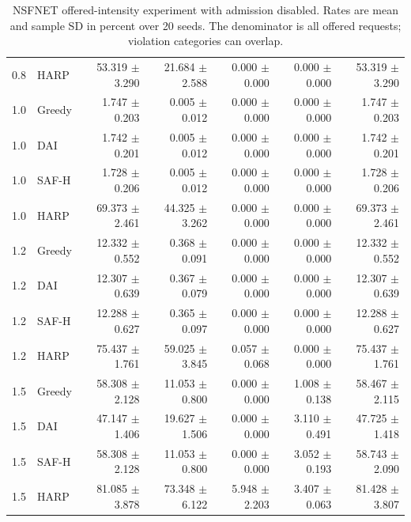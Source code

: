 \begin{table}[p]
\begin{tabular}{llrrrrr}
0.8 & HARP & 53.319 $\pm$ 3.290 & 21.684 $\pm$ 2.588 & 0.000 $\pm$ 0.000 & 0.000 $\pm$ 0.000 & 53.319 $\pm$ 3.290 \\
1.0 & Greedy & 1.747 $\pm$ 0.203 & 0.005 $\pm$ 0.012 & 0.000 $\pm$ 0.000 & 0.000 $\pm$ 0.000 & 1.747 $\pm$ 0.203 \\
1.0 & DAI & 1.742 $\pm$ 0.201 & 0.005 $\pm$ 0.012 & 0.000 $\pm$ 0.000 & 0.000 $\pm$ 0.000 & 1.742 $\pm$ 0.201 \\
1.0 & SAF-H & 1.728 $\pm$ 0.206 & 0.005 $\pm$ 0.012 & 0.000 $\pm$ 0.000 & 0.000 $\pm$ 0.000 & 1.728 $\pm$ 0.206 \\
1.0 & HARP & 69.373 $\pm$ 2.461 & 44.325 $\pm$ 3.262 & 0.000 $\pm$ 0.000 & 0.000 $\pm$ 0.000 & 69.373 $\pm$ 2.461 \\
1.2 & Greedy & 12.332 $\pm$ 0.552 & 0.368 $\pm$ 0.091 & 0.000 $\pm$ 0.000 & 0.000 $\pm$ 0.000 & 12.332 $\pm$ 0.552 \\
1.2 & DAI & 12.307 $\pm$ 0.639 & 0.367 $\pm$ 0.079 & 0.000 $\pm$ 0.000 & 0.000 $\pm$ 0.000 & 12.307 $\pm$ 0.639 \\
1.2 & SAF-H & 12.288 $\pm$ 0.627 & 0.365 $\pm$ 0.097 & 0.000 $\pm$ 0.000 & 0.000 $\pm$ 0.000 & 12.288 $\pm$ 0.627 \\
1.2 & HARP & 75.437 $\pm$ 1.761 & 59.025 $\pm$ 3.845 & 0.057 $\pm$ 0.068 & 0.000 $\pm$ 0.000 & 75.437 $\pm$ 1.761 \\
1.5 & Greedy & 58.308 $\pm$ 2.128 & 11.053 $\pm$ 0.800 & 0.000 $\pm$ 0.000 & 1.008 $\pm$ 0.138 & 58.467 $\pm$ 2.115 \\
1.5 & DAI & 47.147 $\pm$ 1.406 & 19.627 $\pm$ 1.506 & 0.000 $\pm$ 0.000 & 3.110 $\pm$ 0.491 & 47.725 $\pm$ 1.418 \\
1.5 & SAF-H & 58.308 $\pm$ 2.128 & 11.053 $\pm$ 0.800 & 0.000 $\pm$ 0.000 & 3.052 $\pm$ 0.193 & 58.743 $\pm$ 2.090 \\
1.5 & HARP & 81.085 $\pm$ 3.878 & 73.348 $\pm$ 6.122 & 5.948 $\pm$ 2.203 & 3.407 $\pm$ 0.063 & 81.428 $\pm$ 3.807 \\
\bottomrule
\end{tabular}
\caption{NSFNET offered-intensity experiment with admission disabled. Rates are mean and sample SD in percent over 20 seeds. The denominator is all offered requests; violation categories can overlap.}
\label{tab:load_sweep_unprotected_nsfnet}
\end{table}
